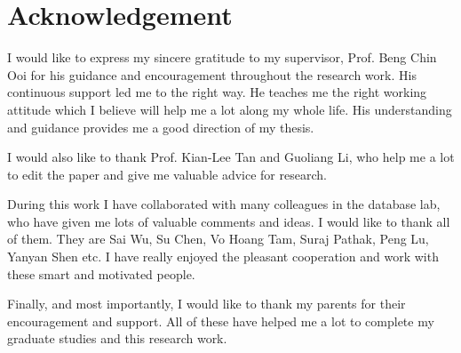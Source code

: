\chapter*{Acknowledgement}
\setcounter{page}{1}

I would like to express my sincere gratitude to my supervisor, Prof. Beng Chin Ooi for his guidance and encouragement throughout the research work. His continuous support led me to the right way. He teaches me the right working attitude which I believe will help me a lot along my whole life. His understanding and guidance provides me a good direction of my thesis.

I would also like to thank Prof. Kian-Lee Tan and Guoliang Li, who help me a lot to edit the paper and give me valuable advice for research.

During this work I have collaborated with many colleagues in the database lab, who have given me lots of valuable comments and ideas. I would like to thank all of them. They are Sai Wu, Su Chen, Vo Hoang Tam, Suraj Pathak, Peng Lu, Yanyan Shen etc. I have really enjoyed the pleasant cooperation and work with these smart and motivated people.

Finally, and most importantly, I would like to thank my parents for their encouragement and support. All of these have helped me a lot to complete my graduate studies and this research work.
